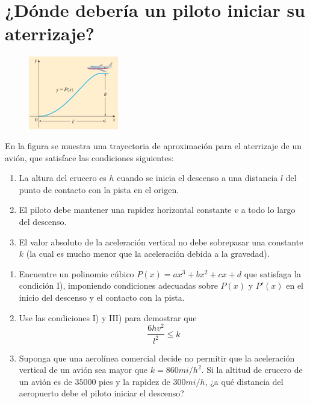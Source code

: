 \chapter*{¿Dónde debería un piloto iniciar su aterrizaje?}
\begin{figure}
	\includegraphics[width = 0.35\textwidth]{recursos/Captura desde 2024-09-21 16-53-03.png}
\end{figure}
\noindent En la figura se muestra una trayectoria de aproximación para el aterrizaje de un avión, que satisface las condiciones siguientes:

\begin{enumerate}[label=\Roman*)]
	\item La altura del crucero es $h$ cuando se inicia el descenso a una distancia $l$ del punto de contacto con la pista en el origen.
	\item El piloto debe mantener una rapidez horizontal constante $v$ a todo lo largo del descenso.
	\item El valor absoluto de la aceleración vertical no debe sobrepasar una constante $k$ (la cual es mucho menor que la aceleración debida a la gravedad).
\end{enumerate}

\begin{enumerate}
	\item Encuentre un polinomio cúbico $P(x)= ax^3+ bx^2 + cx + d$ que satisfaga la condición I),
	      imponiendo condiciones adecuadas sobre $P(x)$ y $P'(x)$ en el inicio del descenso y el contacto
	      con la pista.
	\item Use las condiciones I) y III) para demostrar que$$\frac{6hv^2}{l^2}\leq k$$
	\item Suponga que una aerolínea comercial decide no permitir que la aceleración vertical de un avión sea mayor que $k = 860 mi/h^2$. Si la altitud de crucero de un avión es de $35 000$ pies y la rapidez de $300 mi/h$, ¿a qué distancia del aeropuerto debe el piloto iniciar el descenso?
\end{enumerate}
